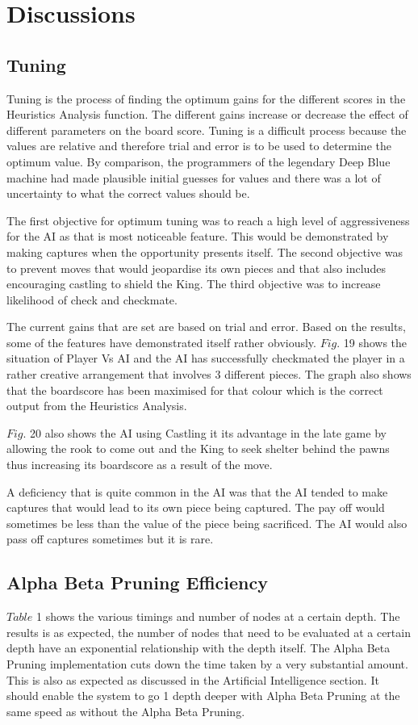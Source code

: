 \documentclass[11pt,a4paper]{article}
\begin{document}
\newpage
\section{Discussions}

\subsection{Tuning}
\indent\indent Tuning is the process of finding the optimum gains for the different scores in the Heuristics Analysis function. The different gains increase or decrease the effect of different parameters on the board score. Tuning is a difficult process because the values are relative and therefore trial and error is to be used to determine the optimum value. By comparison, the programmers of the legendary Deep Blue machine had made plausible initial guesses for values and there was a lot of uncertainty to what the correct values should be.\cite{chess5}

	The first objective for optimum tuning was to reach a high level of aggressiveness for the AI as that is most noticeable feature. This would be demonstrated by making captures when the opportunity presents itself.  The second objective was to prevent moves that would jeopardise its own pieces and that also includes encouraging castling to shield the King. The third objective was to increase likelihood of check and checkmate.

	The current gains that are set are based on trial and error. Based on the results, some of the features have demonstrated itself rather obviously. $Fig.$ 19 shows the situation of Player Vs AI and the AI has successfully checkmated the player in a rather creative arrangement that involves 3 different pieces. The graph also shows that the boardscore has been maximised for that colour which is the correct output from the Heuristics Analysis.

	$Fig.$ 20 also shows the AI using Castling it its advantage in the late game by allowing the rook to come out and the King to seek shelter behind the pawns thus increasing its boardscore as a result of the move. 

	A deficiency that is quite common in the AI was that the AI tended to make captures that would lead to its own piece being captured. The pay off would sometimes be less than the value of the piece being sacrificed. The AI would also pass off captures sometimes but it is rare.

\subsection{Alpha Beta Pruning Efficiency}
\indent\indent $Table$ 1 shows the various timings and number of nodes at a certain depth. The results is as expected, the number of nodes that need to be evaluated at a certain depth have an exponential relationship with the depth itself. The Alpha Beta Pruning implementation cuts down the time taken by a very substantial amount. This is also as expected as discussed in the Artificial Intelligence section. It should enable the system to go 1 depth deeper with Alpha Beta Pruning at the same speed as without the Alpha Beta Pruning.
\end{document}
